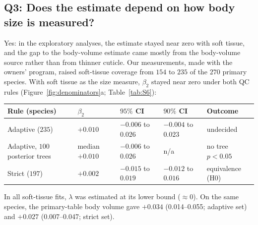 \documentclass[11pt]{article}
\begin{document}
\subsection{Q3: Does the estimate depend on how body size is measured?}\label{sec:q3}

Yes: in the exploratory analyses, the estimate stayed near zero with soft tissue, and the gap to the body-volume
estimate came mostly from the body-volume source rather than from thinner cuticle. Our measurements, made with the
owners' program, raised soft-tissue coverage from $154$ to $235$ of the $270$ primary species. With soft tissue as the
size measure, $\beta_2$ stayed near zero under both QC rules (Figure~\ref{fig:denominators}a; Table~\ref{tab:S6}):
\begin{center}
\small
\begin{tabular}{@{}lllll@{}}
\toprule
Rule (species) & $\beta_2$ & $95\%$ CI & $90\%$ CI & Outcome \\
\midrule
Adaptive ($235$) & $+0.010$ & $-0.006$ to $0.026$ & $-0.004$ to $0.023$ & undecided \\
Adaptive, $100$ posterior trees & median $+0.010$ & $-0.006$ to $0.026$ & n/a & no tree $p < 0.05$ \\
Strict ($197$) & $+0.002$ & $-0.015$ to $0.019$ & $-0.012$ to $0.016$ & equivalence (H0) \\
\bottomrule
\end{tabular}
\end{center}
In all soft-tissue fits, $\lambda$ was estimated at its lower bound ($\approx 0$). On the same species, the
primary-table body volume gave $+0.034$ (0.014--0.055; adaptive set) and $+0.027$ (0.007--0.047; strict set).
\end{document}
